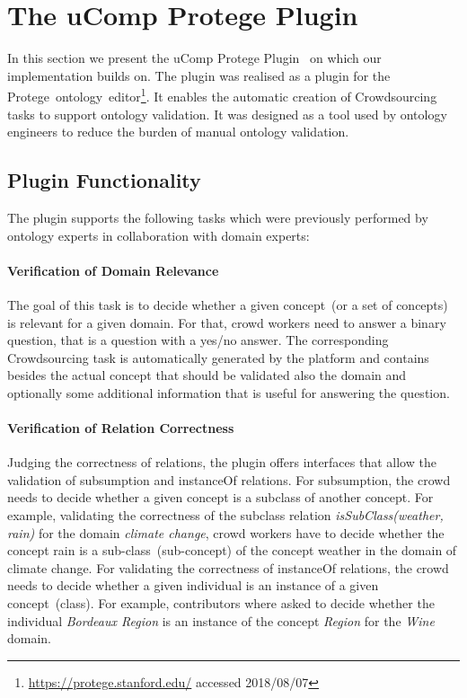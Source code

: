 
\section{The uComp Protege Plugin}\label{sec:ucomp_protege_plugin}
In this section we present the uComp Protege Plugin~\cite{wohlgenannt2016} on which our implementation builds on. The plugin was realised as a plugin for the Protege~ontology~editor\footnote{\url{https://protege.stanford.edu/} accessed 2018/08/07}. It enables the automatic creation of Crowdsourcing tasks to support ontology validation. It was designed as a tool used by ontology engineers to reduce the burden of manual ontology validation.

\subsection{Plugin Functionality}\label{sec:ucomp_protege_plugin_functionality}
The plugin supports the following tasks which were previously performed by ontology experts in collaboration with domain experts:

\paragraph{Verification of Domain Relevance}
The goal of this task is to decide whether a given concept~(or a set of concepts) is relevant for a given domain. For that, crowd workers need to
answer a binary question, that is a question with a yes/no answer. The corresponding Crowdsourcing task is automatically generated by the platform and
contains besides the actual concept that should be validated also the domain and optionally some additional information that is useful for answering 
the question. 

\paragraph{Verification of Relation Correctness}
Judging the correctness of relations, the plugin offers interfaces that allow the validation of subsumption and instanceOf relations. 
For subsumption, the crowd needs to decide whether a given concept is a subclass of another concept. For example, validating the correctness
of the subclass relation \emph{isSubClass(weather, rain)} for the domain \emph{climate change}, crowd workers have to decide whether the concept rain is a sub-class~(sub-concept) of the concept weather in the domain of climate change. For validating the correctness of instanceOf relations, the crowd needs to decide whether a given individual is an instance of a given concept~(class). For example, contributors where asked to decide whether the individual \emph{Bordeaux Region} is an instance of the concept \emph{Region} for the \emph{Wine} domain. 

